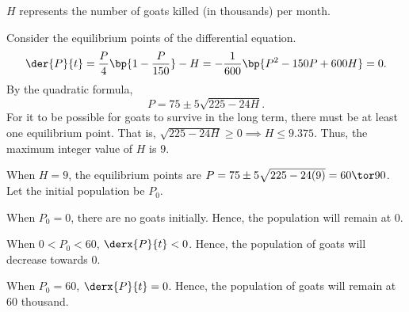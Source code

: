 \begin{solution}
    \begin{ppart}
    $H$ represents the number of goats killed (in thousands) per month.
    \end{ppart}
    \begin{ppart}
        Consider the equilibrium points of the differential equation. \[\der{P}{t} = \frac{P}{4} \bp{1 - \frac{P}{150}} - H = -\frac{1}{600} \bp{P^2 - 150P + 600H} = 0.\] By the quadratic formula, \[P = 75 \pm 5 \sqrt{225 - 24H}.\] For it to be possible for goats to survive in the long term, there must be at least one equilibrium point. That is, $\sqrt{225 - 24H} \geq 0 \implies H \leq 9.375$. Thus, the maximum integer value of $H$ is $9$.
    \end{ppart}
    \begin{ppart}
        When $H = 9$, the equilibrium points are $P = 75 \pm 5\sqrt{225 - 24(9)} = 60 \tor 90$. Let the initial population be $P_0$.

        \begin{center}
        \end{center}

        When $P_0 = 0$, there are no goats initially. Hence, the population will remain at 0.

        When $0 < P_0 < 60$, $\derx{P}{t} < 0$. Hence, the population of goats will decrease towards 0.

        When $P_0 = 60$, $\derx{P}{t} = 0$. Hence, the population of goats will remain at 60 thousand.


\end{ppart}
\end{solution}
